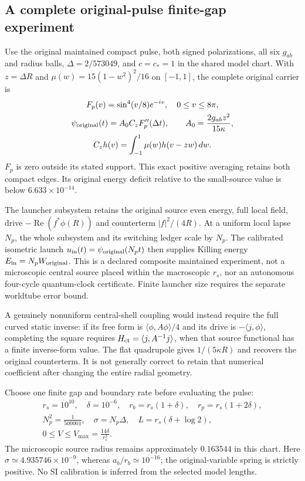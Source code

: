 \documentclass[10pt,twocolumn,letterpaper]{article}
\begin{document}
\subsection{A complete original-pulse finite-gap experiment}
Use the original maintained compact pulse, both signed polarizations,
all six $g_{ab}$ and radius balls, $\Delta=2/573049$, and $c=c_*=1$
in the shared model chart. With $z=\Delta R$ and
$\mu(w)=15(1-w^2)^2/16$ on $[-1,1]$, the complete original carrier is
\begin{equation}
\begin{gathered}
 F_p(v)=\sin^4(v/8)e^{-iv},\quad0\leq v\leq8\pi,\\
 \psi_{\rm original}(t)=A_0 C_zF_p''(\Delta t),\qquad
 A_0=\frac{2g_{ab}z^2}{15\kappa},\\
 C_zh(v)=\int_{-1}^1\mu(w)h(v-zw)\,dw.
\end{gathered}
\label{eq:wp-original}
\end{equation}
$F_p$ is zero outside its stated support. This exact positive averaging
retains both compact edges. Its original energy deficit relative to the
small-source value is below $6.633\times10^{-14}$.

The launcher subsystem retains the original source even energy, full
local field, drive $-\operatorname{Re}(f^*\phi(R))$ and counterterm
$|f|^2/(4R)$. At a uniform local lapse $N_p$, the whole subsystem and
its switching ledger scale by $N_p$. The calibrated isometric launch
$u_{\rm in}(t)=\psi_{\rm original}(N_pt)$ then supplies Killing energy
$E_{\rm in}=N_pW_{\rm original}$. This is a declared composite maintained
experiment, not a microscopic central source placed within the macroscopic
$r_s$, nor an autonomous four-cycle quantum-clock certificate.
Finite launcher size requires the separate worldtube error bound.

A genuinely nonuniform central-shell coupling would instead require
the full curved static inverse: if its free form is
$\langle\phi,A\phi\rangle/4$ and its drive is
$-\langle j,\phi\rangle$, completing the square requires
$H_{\rm ct}=\langle j,A^{-1}j\rangle$, when that source functional has
a finite inverse-form value. The flat quadrupole gives
$1/(5\kappa R)$ and recovers the original counterterm. It is not generally
correct to retain that numerical coefficient after changing the entire
radial geometry.

Choose one finite gap and boundary rate before evaluating the pulse:
\begin{equation}
\begin{gathered}
 r_s=10^{10},\quad\delta=10^{-6},\quad
 r_b=r_s(1+\delta),\quad r_p=r_s(1+2\delta),\\
 N_p^2=\frac1{500001},\quad\sigma=N_p\Delta,\quad
 L=r_s(\delta+\log2),\\
 0\leq V\leq V_{\max}=\frac{14\delta}{r_s^2}.
\end{gathered}
\label{eq:wp-gap}
\end{equation}
The microscopic source radius remains approximately $0.163544$ in this
chart. Here $\sigma\simeq4.935746\times10^{-9}$, whereas
$a_b/r_b\simeq10^{-16}$; the original-variable spring is strictly positive.
No SI calibration is inferred from the selected model lengths.
\end{document}
